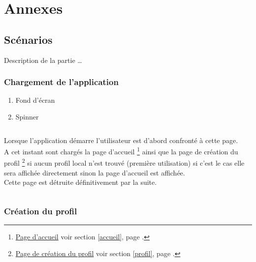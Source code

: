 \documentclass{report}
\begin{document}
\chapter{Annexes}

	\section{Scénarios}
	
		Description de la partie \ldots
		
		\newpage

\newpage
	
	\subsection{Chargement de l'application}
	
		\hypertarget{Chargement de l'application}{}

		
		
		\begin{enumerate}
		  \item Fond d'écran
		  \item Spinner
		\end{enumerate}
		
		$\,$	
			
		Lorsque l'application démarre l'utilisateur est d'abord confronté à cette
		page. \\
		A cet instant sont chargés la page d'accueil%
		\footnote[1]{
			\hyperlink{Page d'accueil}{Page d'accueil}
			\og voir section \ref{accueil}, page \pageref{accueil}.\fg
		}
		ainsi que la page de création du profil%
		\footnote[2]{
			\hyperlink{Création du profil}{Page de création du profil}
			\og voir section \ref{profil}, page \pageref{profil}.\fg
		}
		si aucun profil	local n'est trouvé (première utilisation) si c'est le cas
		elle sera affichée directement sinon la page d'accueil%
		\footnotemark[1]
		est affichée. \\
		Cette page est détruite définitivement par la suite.
			
		$\,$
	
\newpage

	\subsection{Création du profil}
		\hypertarget{Création du profil}{}
		\label{profil}
	
		
		
\end{document}
